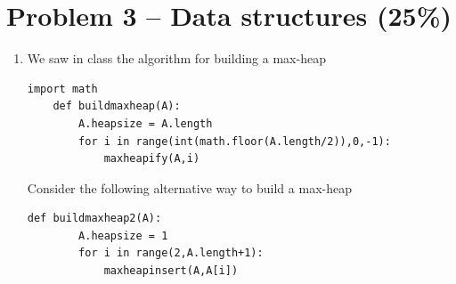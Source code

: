 \documentclass[12pt,letterpaper]{article}
\begin{document}
\section*{Problem 3 -- Data structures (25\%)}

\begin{enumerate}
    \item We saw in class the algorithm for building a max-heap

     \begin{lstlisting}[style = Python]
    import math
    def buildmaxheap(A):
        A.heapsize = A.length
        for i in range(int(math.floor(A.length/2)),0,-1):
            maxheapify(A,i)
    \end{lstlisting}

Consider the following alternative way to build a max-heap

     \begin{lstlisting}[style = Python]
    def buildmaxheap2(A):
        A.heapsize = 1
        for i in range(2,A.length+1):
            maxheapinsert(A,A[i])
    \end{lstlisting}


\end{enumerate}
\end{document}
